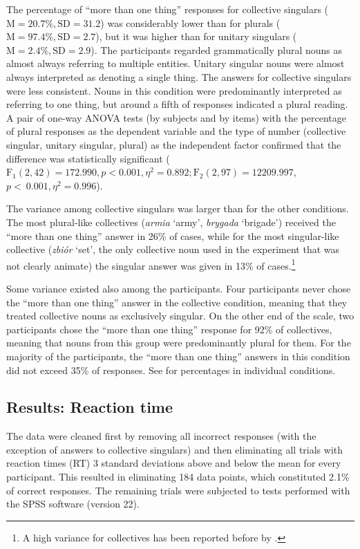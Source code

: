 \documentclass[output=paper]{langscibook}
\begin{document}
The percentage of ``more than one thing'' responses for collective singulars ($\text{M}=20.7\%, \text{SD}=31.2$) was considerably lower than for plurals ($\text{M}=97.4\%, \text{SD}=2.7$), but it was higher than for unitary singulars ($\text{M}=2.4\%, \text{SD}=2.9$). The participants regarded grammatically plural nouns as almost always referring to multiple entities. Unitary singular nouns were almost always interpreted as denoting a single thing.  The answers for collective singulars were less consistent. Nouns in this condition were predominantly interpreted as referring to one thing, but around a fifth of responses indicated a plural reading. A pair of one-way ANOVA tests (by subjects and by items) with the percentage of plural responses as the dependent variable and the type of number (collective singular, unitary singular, plural) as the independent factor confirmed that the difference was statistically significant ($\text{F}_{1}(2,42)=172.990, p<0.001, \eta^2=0.892; \text{F}_{2}(2,97)=12209.997$, $p<~0.001, \eta^2=0.996$).

The variance among collective singulars was larger than for the other conditions. The most plural-like collectives (\textit{armia} ‘army’, \textit{brygada} ‘brigade’) received the ``more than one thing'' answer in 26\% of cases, while for the most singular-like collective (\textit{zbiór} ‘set’, the only collective noun used in the experiment that was not clearly animate) the singular answer was given in 13\% of cases.\footnote{A high variance for collectives has been reported before by \citet{nenonenMismatchesGrammaticalNumber2010}.}

Some variance existed also among the participants. Four participants never chose the ``more than one thing'' answer in the collective condition, meaning that they treated collective nouns as exclusively singular. On the other end of the scale, two participants chose the ``more than one thing'' response for 92\% of collectives, meaning that nouns from this group were predominantly plural for them. For the majority of the participants, the ``more than one thing'' answers in this condition did not exceed 35\% of responses. See  for percentages in individual conditions.

\subsection{Results: Reaction time}
The data were cleaned first by removing all incorrect responses (with the exception of answers to collective singulars) %
and then eliminating all trials with reaction times (RT) 3 standard deviations above and below the mean for every participant.\footnotemark{} This resulted in eliminating 184 data points, which constituted 2.1\% of correct responses. The remaining trials were subjected to tests performed with the SPSS software (version 22).
\end{document}

